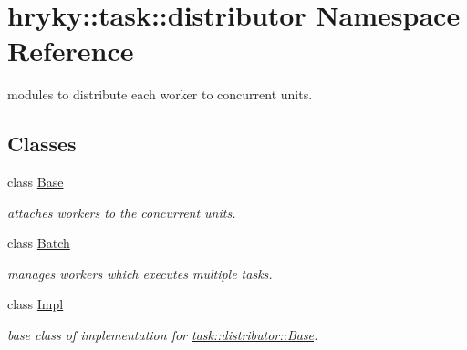 \hypertarget{namespacehryky_1_1task_1_1distributor}{\section{hryky\-:\-:task\-:\-:distributor Namespace Reference}
\label{namespacehryky_1_1task_1_1distributor}
}


modules to distribute each worker to concurrent units.  


\subsection*{Classes}
\begin{DoxyCompactItemize}
\item 
class \hyperlink{classhryky_1_1task_1_1distributor_1_1_base}{Base}
\begin{DoxyCompactList}\small\item\em attaches workers to the concurrent units. \end{DoxyCompactList}\item 
class \hyperlink{classhryky_1_1task_1_1distributor_1_1_batch}{Batch}
\begin{DoxyCompactList}\small\item\em manages workers which executes multiple tasks. \end{DoxyCompactList}\item 
class \hyperlink{classhryky_1_1task_1_1distributor_1_1_impl}{Impl}
\begin{DoxyCompactList}\small\item\em base class of implementation for \hyperlink{classhryky_1_1task_1_1distributor_1_1_base}{task\-::distributor\-::\-Base}. \end{DoxyCompactList}\end{DoxyCompactItemize}
